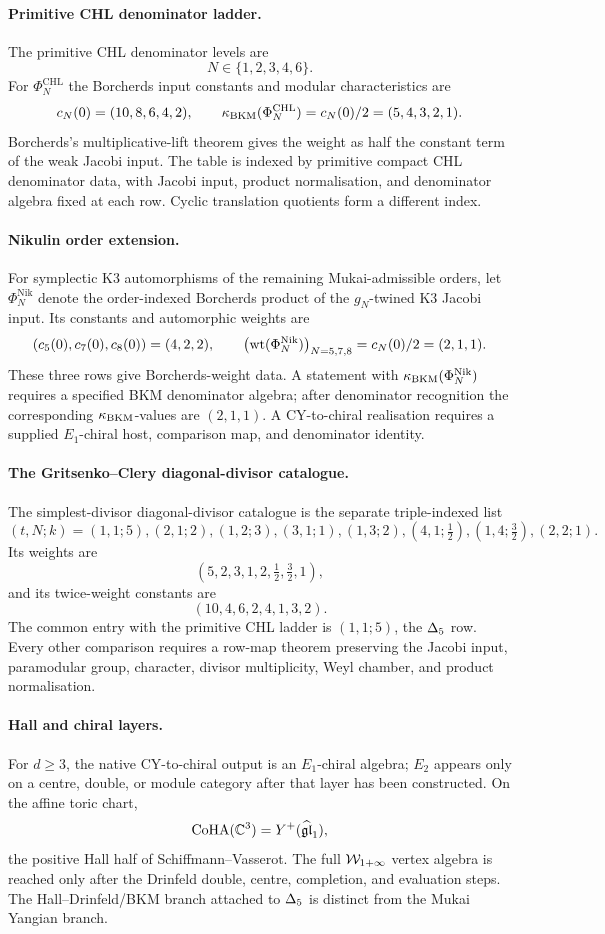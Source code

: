 \paragraph{Primitive CHL denominator ladder.}
The primitive CHL denominator levels are
\[
  N\in\{1,2,3,4,6\}.
\]
For \(\Phi_N^{\mathrm{CHL}}\) the Borcherds input constants and modular
characteristics are
\[
  c_N(0)=(10,8,6,4,2),
  \qquad
  \kappa_{\mathrm{BKM}}(\Phi_N^{\mathrm{CHL}})=c_N(0)/2=(5,4,3,2,1).
\]
Borcherds's multiplicative-lift theorem gives the weight as half the
constant term of the weak Jacobi input. The table is indexed by
primitive compact CHL denominator data, with Jacobi input, product
normalisation, and denominator algebra fixed at each row. Cyclic
translation quotients form a different index.

\paragraph{Nikulin order extension.}
For symplectic K3 automorphisms of the remaining Mukai-admissible
orders, let \(\Phi_N^{\mathrm{Nik}}\) denote the order-indexed
Borcherds product of the \(g_N\)-twined K3 Jacobi input. Its constants
and automorphic weights are
\[
  (c_5(0),c_7(0),c_8(0))=(4,2,2),
  \qquad
  \bigl(\operatorname{wt}(\Phi_N^{\mathrm{Nik}})\bigr)_{N=5,7,8}
  =c_N(0)/2=(2,1,1).
\]
These three rows give Borcherds-weight data. A statement with
\(\kappa_{\mathrm{BKM}}(\Phi_N^{\mathrm{Nik}})\) requires a specified BKM denominator
algebra; after denominator recognition the corresponding \(\kappa_{\mathrm{BKM}}\)-values
are \((2,1,1)\). A CY-to-chiral realisation requires a supplied
\(E_1\)-chiral host, comparison map, and denominator identity.

\paragraph{The Gritsenko--Clery diagonal-divisor catalogue.}
The simplest-divisor diagonal-divisor catalogue is the separate
triple-indexed list
\[
 (t,N;k)=
 (1,1;5),(2,1;2),(1,2;3),(3,1;1),(1,3;2),
 (4,1;\tfrac12),(1,4;\tfrac32),(2,2;1).
\]
Its weights are
\[
  (5,2,3,1,2,\tfrac12,\tfrac32,1),
\]
and its twice-weight constants are
\[
  (10,4,6,2,4,1,3,2).
\]
The common entry with the primitive CHL ladder is \((1,1;5)\), the
\(\Delta_5\) row. Every other comparison requires a row-map theorem
preserving the Jacobi input, paramodular group, character, divisor
multiplicity, Weyl chamber, and product normalisation.

\paragraph{Hall and chiral layers.}
For \(d\geq3\), the native CY-to-chiral output is an \(E_1\)-chiral
algebra; \(E_2\) appears only on a centre, double, or module category
after that layer has been constructed. On the affine toric chart,
\[
  \mathrm{CoHA}(\mathbb{C}^3)=Y^+(\widehat{\mathfrak{gl}}_1),
\]
the positive Hall half of Schiffmann--Vasserot. The full
\(\mathcal{W}_{1+\infty}\) vertex algebra is reached only after the
Drinfeld double, centre, completion, and evaluation steps. The
Hall--Drinfeld/BKM branch attached to \(\Delta_5\) is distinct from
the Mukai Yangian branch.

